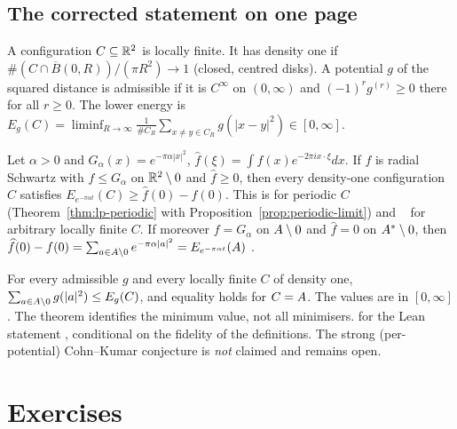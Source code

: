 \subsection{The corrected statement on one page}

\begin{definition}[Setting]
A configuration $C\subseteq\mathbb{R}^2$ is locally finite. It has density one if $\#(C\cap\overline B(0,R))/(\pi R^2)\to1$
(closed, centred disks). A potential $g$ of the squared distance is admissible if it is $C^\infty$ on $(0,\infty)$ and
$(-1)^rg^{(r)}\ge0$ there for all $r\ge0$. The lower energy is
$E_g(C)=\liminf_{R\to\infty}\frac{1}{\#C_R}\sum_{x\ne y\in C_R}g(|x-y|^2)\in[0,\infty]$.
\end{definition}

\begin{lemma}
Let $\alpha>0$ and $G_\alpha(x)=e^{-\pi\alpha|x|^2}$, $\widehat f(\xi)=\int f(x)e^{-2\pi ix\cdot\xi}dx$. If $f$ is radial
Schwartz with $f\le G_\alpha$ on $\mathbb{R}^2\setminus0$ and $\widehat f\ge0$, then every density-one configuration $C$
satisfies $E_{e^{-\pi\alpha t}}(C)\ge\widehat f(0)-f(0)$. This is \tierC{} for periodic $C$ (Theorem~\ref{thm:lp-periodic}
with Proposition~\ref{prop:periodic-limit}) and \tierL{}~\cite{oai} for arbitrary locally finite $C$. If moreover
$f=G_\alpha$ on $A\setminus0$ and $\widehat f=0$ on $A^*\setminus0$, then
$\widehat f(0)-f(0)=\sum_{a\in A\setminus0}e^{-\pi\alpha|a|^2}=E_{e^{-\pi\alpha t}}(A)$ \tierC{}.
\end{lemma}

\begin{theorem}
For every admissible $g$ and every locally finite $C$ of density one,
$\sum_{a\in A\setminus0}g(|a|^2)\le E_g(C)$, and equality holds for $C=A$. The values are in $[0,\infty]$. The
theorem identifies the minimum value, not all minimisers. \tierA{} for the Lean statement
, conditional on the fidelity of the definitions. The strong
(per-potential) Cohn--Kumar conjecture is \emph{not} claimed and remains open.
\end{theorem}

\section{Exercises}
\label{sec:ex1}

